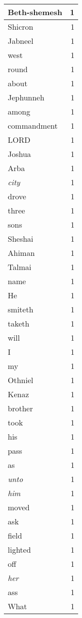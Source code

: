 \begin{center}
\begin{longtable}{l|r}
Beth-shemesh & 1\\ \hline 
Shicron & 1\\ \hline 
Jabneel & 1\\ \hline 
west & 1\\ \hline 
round & 1\\ \hline 
about & 1\\ \hline 
Jephunneh & 1\\ \hline 
among & 1\\ \hline 
commandment & 1\\ \hline 
LORD & 1\\ \hline 
Joshua & 1\\ \hline 
Arba & 1\\ \hline 
\emph{city} & 1\\ \hline 
drove & 1\\ \hline 
three & 1\\ \hline 
sons & 1\\ \hline 
Sheshai & 1\\ \hline 
Ahiman & 1\\ \hline 
Talmai & 1\\ \hline 
name & 1\\ \hline 
He & 1\\ \hline 
smiteth & 1\\ \hline 
taketh & 1\\ \hline 
will & 1\\ \hline 
I & 1\\ \hline 
my & 1\\ \hline 
Othniel & 1\\ \hline 
Kenaz & 1\\ \hline 
brother & 1\\ \hline 
took & 1\\ \hline 
his & 1\\ \hline 
pass & 1\\ \hline 
as & 1\\ \hline 
\emph{unto} & 1\\ \hline 
\emph{him} & 1\\ \hline 
moved & 1\\ \hline 
ask & 1\\ \hline 
field & 1\\ \hline 
lighted & 1\\ \hline 
off & 1\\ \hline 
\emph{her} & 1\\ \hline 
ass & 1\\ \hline 
What & 1\\ \hline 

\end{longtable}
\end{center}
